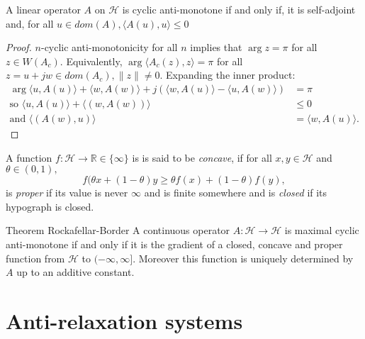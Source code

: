 \begin{corollary}
    A linear operator $A$ on $\mathcal{H}$ is cyclic anti-monotone if and only if, it is self-adjoint and, for all $u \in dom(A), \langle A(u), u \rangle \leq 0$
\end{corollary}
\begin{proof}
    $n$-cyclic anti-monotonicity for all $n$ implies that $\arg z = \pi$ for all $z \in W(A_c)$. Equivalently, $\arg\langle A_c(z), z \rangle =  \pi $ for all $z = u +jw \in dom(A_c), \lVert z \rVert \neq 0$. Expanding the inner product:
    \begin{align*}
               \arg \langle u, A(u) \rangle  + \langle w, A(w) \rangle + j(\langle w,A(u) \rangle - \langle u,A(w) \rangle) &= \pi\\
               \text{so } \langle u, A(u) \rangle + \langle (w, A(w)) \rangle &\leq 0 \\
               \text{and } \langle(A(w), u) \rangle &= \langle w, A(u) \rangle.
    \end{align*}
\end{proof}


A function $f : \mathcal{H} \rightarrow \mathbb{R} \in \{\infty\}$ is is said to be \textit{concave}, if for all $x, y \in \mathcal{H}$ and $\theta \in (0,1),$
\begin{equation}
    f(\theta x+(1-\theta)y \geq \theta f(x) + (1-\theta)f(y),
\end{equation}
is \textit{proper} if its value is never $\infty$ and is finite somewhere and is \textit{closed} if its hypograph is closed.

Theorem Rockafellar-Border A continuous operator $A : \mathcal{H} \rightarrow \mathcal{H}$ is maximal cyclic anti-monotone if and only if it is the gradient of a closed, concave and proper function from $\mathcal{H}$ to $(-\infty, \infty]$. Moreover this function is uniquely determined by $A$ up to an additive constant.
\section{Anti-relaxation systems}

